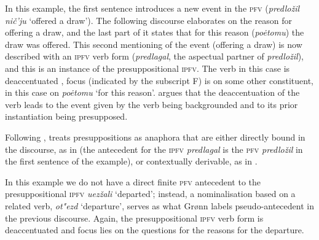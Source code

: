 \documentclass[output=paper]{langscibook}
\begin{document}
\noindent In this example, the first sentence introduces a new event in the \textsc{pfv} (\textit{predložil nič'ju} `offered a draw'). The following discourse elaborates on the reason for offering a draw, and the last part of it states that for this reason (\textit{poėtomu}) the draw was offered. This second mentioning of the event (offering a draw) is now described with an \textsc{ipfv} verb form (\textit{predlagal}, the aspectual partner of \textit{predložil}), and this is an instance of the presuppositional \textsc{ipfv}. The verb in this case is deaccentuated \citep[see also][]{paduceva96}, focus (indicated by the subscript F) is on some other constituent, in this case on \textit{poėtomu} `for this reason'. \citeauthor{gronndiss} argues that the deaccentuation of the verb leads to the event given by the verb being backgrounded and to its prior instantiation being presupposed.

Following \citet{geurtssandt97}, \citet{gronndiss} treats presuppositions as anaphora that are either directly bound in the discourse, as in  (the antecedent for the \textsc{ipfv} \textit{predlagal} is the \textsc{pfv} \textit{predložil} in the first sentence of the example), or contextually derivable, as in . 

\label{gehr:ex:departure}
\z 

\noindent In this example we do not have a direct finite \textsc{pfv} antecedent to the presuppositional \textsc{ipfv} \textit{uezžali} `departed'; instead, a nominalisation based on a related verb, \textit{ot"ezd} `departure', serves as what Grønn labels pseudo-antecedent in the previous discourse. Again, the presuppositional \textsc{ipfv} verb form is deaccentuated and focus lies on the questions for the reasons for the departure. 
\end{document}
